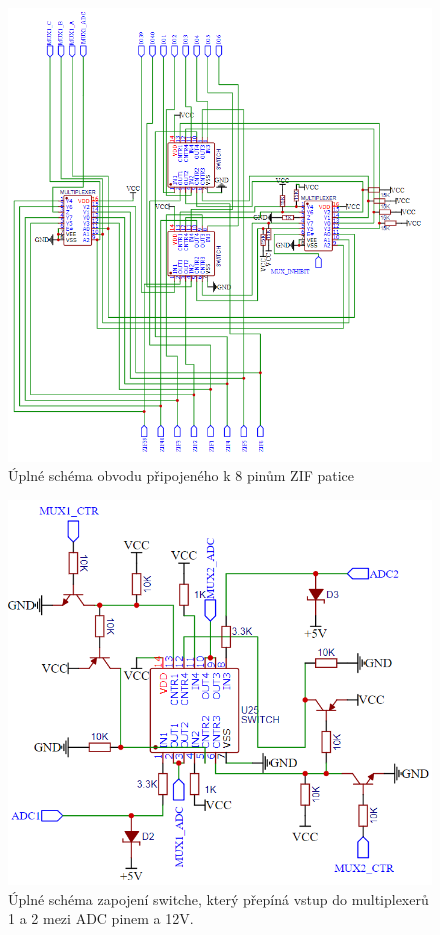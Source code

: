 \documentclass[11pt,a4paper,twoside,openright]{report}
\begin{document}
\begin{figure}[ht!]
  \includegraphics[width=\linewidth]{img/pin_switches.png}
  \centering
  \caption{Úplné schéma obvodu připojeného k 8 pinům ZIF patice}
  \label{appendix:pin_switches}
\end{figure}

\begin{figure}[ht!]
  \includegraphics[width=\linewidth]{img/mux_input_control.png}
  \centering
  \caption{Úplné schéma zapojení switche, který přepíná vstup do multiplexerů 1 a 2 mezi ADC pinem a 12V.}
  \label{appendix:mux_input_control}
\end{figure}
\end{document}
